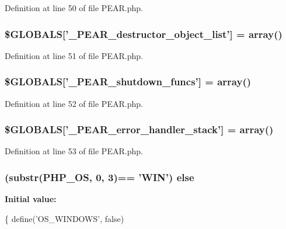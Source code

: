 Definition at line 50 of file P\-E\-A\-R.\-php.

\hypertarget{PEAR_8php_a46e1d062e4e9379133e4b4806e9f4cdd}{
\subsubsection[{\$\-G\-L\-O\-B\-A\-L\-S}]{\setlength{\rightskip}{0pt plus 5cm}\$G\-L\-O\-B\-A\-L\-S\mbox{[}'\-\_\-\-P\-E\-A\-R\-\_\-destructor\-\_\-object\-\_\-list'\mbox{]} = array()}}\label{PEAR_8php_a46e1d062e4e9379133e4b4806e9f4cdd}


Definition at line 51 of file P\-E\-A\-R.\-php.

\hypertarget{PEAR_8php_a1e8a8915e879323948ae30d5217c515c}{
\subsubsection[{\$\-G\-L\-O\-B\-A\-L\-S}]{\setlength{\rightskip}{0pt plus 5cm}\$G\-L\-O\-B\-A\-L\-S\mbox{[}'\-\_\-\-P\-E\-A\-R\-\_\-shutdown\-\_\-funcs'\mbox{]} = array()}}\label{PEAR_8php_a1e8a8915e879323948ae30d5217c515c}


Definition at line 52 of file P\-E\-A\-R.\-php.

\hypertarget{PEAR_8php_ae888e544d830e6c8570cd51fd614de27}{
\subsubsection[{\$\-G\-L\-O\-B\-A\-L\-S}]{\setlength{\rightskip}{0pt plus 5cm}\$G\-L\-O\-B\-A\-L\-S\mbox{[}'\-\_\-\-P\-E\-A\-R\-\_\-error\-\_\-handler\-\_\-stack'\mbox{]} = array()}}\label{PEAR_8php_ae888e544d830e6c8570cd51fd614de27}


Definition at line 53 of file P\-E\-A\-R.\-php.

\hypertarget{PEAR_8php_aa8a49739e8eb898476e14127c4cd0a49}{
\subsubsection[{else}]{ (substr(P\-H\-P\-\_\-\-O\-S, 0, 3)== 'W\-I\-N') else}}\label{PEAR_8php_aa8a49739e8eb898476e14127c4cd0a49}
{\bfseries Initial value\-:}
\begin{DoxyCode}
\{
    define(\textcolor{stringliteral}{'OS\_WINDOWS'}, \textcolor{keyword}{false})
\end{DoxyCode}


